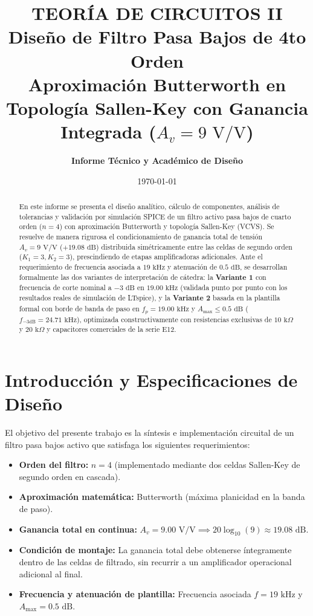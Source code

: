 \documentclass[a4paper,11pt]{article}
\title{\textbf{\Large TEORÍA DE CIRCUITOS II}\\[0.3cm]
\textbf{\huge Diseño de Filtro Pasa Bajos de 4to Orden}\\[0.2cm]
\large Aproximación Butterworth en Topología Sallen-Key con Ganancia Integrada ($A_v = 9\text{ V/V}$)}
\author{\textbf{Informe Técnico y Académico de Diseño}}
\date{\today}
\begin{document}
\maketitle

\begin{abstract}
En este informe se presenta el diseño analítico, cálculo de componentes, análisis de tolerancias y validación por simulación SPICE de un filtro activo pasa bajos de cuarto orden ($n=4$) con aproximación Butterworth y topología Sallen-Key (VCVS). Se resuelve de manera rigurosa el condicionamiento de ganancia total de tensión $A_v = 9\text{ V/V}$ ($+19.08\text{ dB}$) distribuida simétricamente entre las celdas de segundo orden ($K_1 = 3, K_2 = 3$), prescindiendo de etapas amplificadoras adicionales. Ante el requerimiento de frecuencia asociada a $19\text{ kHz}$ y atenuación de $0.5\text{ dB}$, se desarrollan formalmente las dos variantes de interpretación de cátedra: la \textbf{Variante 1} con frecuencia de corte nominal a $-3\text{ dB}$ en $19.00\text{ kHz}$ (validada punto por punto con los resultados reales de simulación de LTspice), y la \textbf{Variante 2} basada en la plantilla formal con borde de banda de paso en $f_p = 19.00\text{ kHz}$ y $A_{\max} \le 0.5\text{ dB}$ ($f_{-3\text{dB}} = 24.71\text{ kHz}$), optimizada constructivamente con resistencias exclusivas de $10\text{ k}\Omega$ y $20\text{ k}\Omega$ y capacitores comerciales de la serie E12.
\end{abstract}

\vspace{0.3cm}
\tableofcontents
\vspace{0.5cm}

\section{Introducción y Especificaciones de Diseño}
El objetivo del presente trabajo es la síntesis e implementación circuital de un filtro pasa bajos activo que satisfaga los siguientes requerimientos:
\begin{itemize}
    \item \textbf{Orden del filtro:} $n = 4$ (implementado mediante dos celdas Sallen-Key de segundo orden en cascada).
    \item \textbf{Aproximación matemática:} Butterworth (máxima planicidad en la banda de paso).
    \item \textbf{Ganancia total en continua:} $A_v = 9.00\text{ V/V} \implies 20\log_{10}(9) \approx 19.08\text{ dB}$.
    \item \textbf{Condición de montaje:} La ganancia total debe obtenerse íntegramente dentro de las celdas de filtrado, sin recurrir a un amplificador operacional adicional al final.
    \item \textbf{Frecuencia y atenuación de plantilla:} Frecuencia asociada $f = 19\text{ kHz}$ y $A_{\max} = 0.5\text{ dB}$.
\end{itemize}
\end{document}
